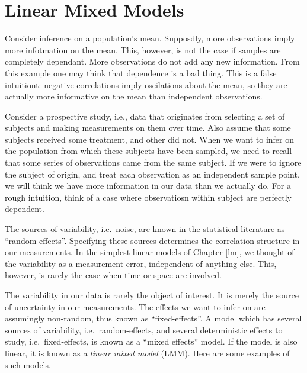 \documentclass[]{book}
\theoremstyle{definition}
\theoremstyle{definition}
\theoremstyle{definition}
\theoremstyle{remark}
\let\BeginKnitrBlock\begin \let\EndKnitrBlock\end
\begin{document}
\chapter{Linear Mixed Models}\label{lme}

\BeginKnitrBlock{example}[Dependent Samples on the Mean]
\protect\hypertarget{exm:dependence}{}{\label{exm:dependence}
{} }Consider inference on a
population's mean. Supposdly, more observations imply more infotmation
on the mean. This, however, is not the case if samples are completely
dependant. More observations do not add any new information. From this
example one may think that dependence is a bad thing. This is a false
intuitiont: negative correlations imply oscilations about the mean, so
they are actually more informative on the mean than independent
observations.
\EndKnitrBlock{example}

\BeginKnitrBlock{example}[Repeated Measures]
\protect\hypertarget{exm:repeated-measures}{}{\label{exm:repeated-measures}
{} }Consider a prospective study, i.e.,
data that originates from selecting a set of subjects and making
measurements on them over time. Also assume that some subjects received
some treatment, and other did not. When we want to infer on the
population from which these subjects have been sampled, we need to
recall that some series of observations came from the same subject. If
we were to ignore the subject of origin, and treat each observation as
an independent sample point, we will think we have more information in
our data than we actually do. For a rough intuition, think of a case
where observatiosn within subject are perfectly dependent.
\EndKnitrBlock{example}

The sources of variability, i.e.~noise, are known in the statistical
literature as ``random effects''. Specifying these sources determines
the correlation structure in our measurements. In the simplest linear
models of Chapter \ref{lm}, we thought of the variability as a
measurement error, independent of anything else. This, however, is
rarely the case when time or space are involved.

The variability in our data is rarely the object of interest. It is
merely the source of uncertainty in our measurements. The effects we
want to infer on are assumingly non-random, thus known as
``fixed-effects''. A model which has several sources of variability,
i.e.~random-effects, and several deterministic effects to study,
i.e.~fixed-effects, is known as a ``mixed effects'' model. If the model
is also linear, it is known as a \emph{linear mixed model} (LMM). Here
are some examples of such models.
\end{document}
